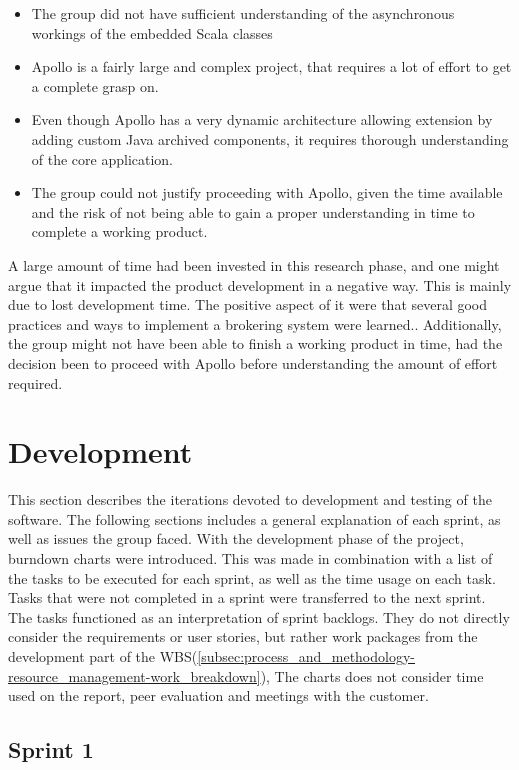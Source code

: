 \begin{itemize}
\item The group did not have sufficient understanding of the asynchronous workings of the embedded Scala classes
\item Apollo is a fairly large and complex project, that requires a lot of effort to get a complete grasp on.
\item Even though Apollo has a very dynamic architecture  allowing extension by adding custom Java archived components, it requires thorough understanding of the core application.
\item The group could not justify proceeding with Apollo, given the time available and the risk of not being able to gain a proper understanding in time to complete a working product.
\end{itemize}

A large amount of time had been invested in this research phase, and one might argue that it impacted the product development in a negative way. This is mainly due to lost development time. The positive aspect of it were that several good practices and ways to implement a brokering system were learned.. Additionally, the group might not have been able to finish a working product in time, had the decision been to proceed with Apollo before understanding the amount of effort required.

\section{Development}
\label{subsec:project_lifecycle-development}

This section describes the iterations devoted to development and testing of the software. The following sections includes a general explanation of each sprint, as well as issues the group faced. With the development phase of the project, burndown charts were introduced. This was made in combination with a list of the tasks to be executed for each sprint, as well as the time usage on each task. Tasks that were not completed in a sprint were transferred to the next sprint. The tasks functioned as an interpretation of sprint backlogs. They do not directly consider the requirements or user stories, but rather work packages from the development part of the WBS(\ref{subsec:process_and_methodology-resource_management-work_breakdown}),  The charts does not consider time used on the report, peer evaluation and meetings with the customer.

\subsection{Sprint 1}
\label{subsec:project_lifecycle-development-sprint_1}

